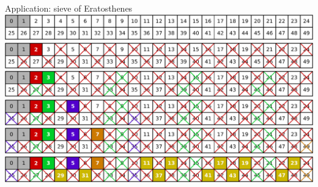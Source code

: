 \documentclass[svgnames]{beamer}
\begin{document}
\begin{frame}{Application: sieve of Eratosthenes}
 \includegraphics[width=\textwidth]{eratosthenes_1}\\[0.3truecm]
 \includegraphics[width=\textwidth]{eratosthenes_2}\\[0.3truecm]
 \includegraphics[width=\textwidth]{eratosthenes_3}\\[0.3truecm]
 \includegraphics[width=\textwidth]{eratosthenes_4}\\[0.3truecm]
 \includegraphics[width=\textwidth]{eratosthenes_5}\\[0.3truecm]
 \includegraphics[width=\textwidth]{eratosthenes_6}
\end{frame}
\end{document}
